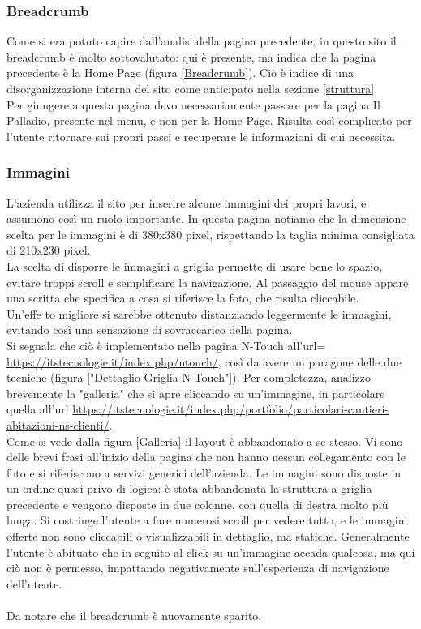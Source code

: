 \subsubsection{Breadcrumb}
Come si era potuto capire dall'analisi della pagina precedente, in questo sito il breadcrumb è molto sottovalutato: qui è presente, ma indica che la pagina precedente è la Home Page (figura \ref{Breadcrumb}). Ciò è indice di una disorganizzazione interna del sito come anticipato nella sezione \ref{struttura}. \\
Per giungere a questa pagina devo necessariamente passare per la pagina Il Palladio, presente nel menu, e non per la Home Page. Risulta così complicato per l'utente ritornare sui propri passi e recuperare le informazioni di cui necessita.

\subsubsection{Immagini}
L'azienda utilizza il sito per inserire alcune immagini dei propri lavori, e assumono così un ruolo importante. In questa pagina notiamo che la dimensione scelta per le immagini è di 380x380 pixel, rispettando la taglia minima consigliata di 210x230 pixel. \\La scelta di disporre le immagini a griglia permette di usare bene lo spazio, evitare troppi scroll e semplificare la navigazione.
Al passaggio del mouse appare una scritta che specifica a cosa si riferisce la foto, che risulta cliccabile. \\
Un'effe to migliore si sarebbe ottenuto distanziando leggermente le immagini, evitando così una sensazione di sovraccarico della pagina. \\ Si segnala che ciò è implementato nella pagina N-Touch all'url= \url{https://itstecnologie.it/index.php/ntouch/}, così da avere un paragone delle due tecniche (figura \ref{"Dettaglio Griglia N-Touch"}).
Per completezza, analizzo brevemente la "galleria" che si apre cliccando su un'immagine, in particolare quella all'url \url{https://itstecnologie.it/index.php/portfolio/particolari-cantieri-abitazioni-ns-clienti/}. \\
Come si vede dalla figura \ref{Galleria} il layout è abbandonato a se stesso. Vi sono delle brevi frasi all'inizio della pagina che non hanno nessun collegamento con le foto e si riferiscono a servizi generici dell'azienda. Le immagini sono disposte in un ordine quasi privo di logica: è stata abbandonata la struttura a griglia precedente e vengono disposte in due colonne, con quella di destra molto più lunga. Si costringe l'utente a fare numerosi scroll per vedere tutto, e le immagini offerte non sono cliccabili o visualizzabili in dettaglio, ma statiche. Generalmente l'utente è abituato che in seguito al click su un'immagine accada qualcosa, ma qui ciò non è permesso, impattando negativamente sull'esperienza di navigazione dell'utente. \\
\\ Da notare che il breadcrumb è nuovamente sparito.

